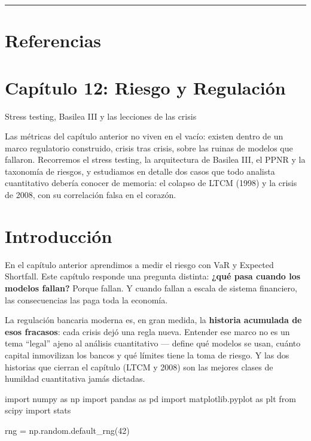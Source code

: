 \documentclass[
  spanish,
  letterpaper,
  DIV=11,
  numbers=noendperiod]{scrreprt}
\newenvironment{Shaded}{\begin{snugshade}}{\end{snugshade}}
\newcommand{\DecValTok}[1]{\textcolor[rgb]{0.68,0.00,0.00}{#1}}
\newcommand{\ImportTok}[1]{\textcolor[rgb]{0.00,0.46,0.62}{#1}}
\newcommand{\NormalTok}[1]{\textcolor[rgb]{0.00,0.23,0.31}{#1}}
\newcommand{\OperatorTok}[1]{\textcolor[rgb]{0.37,0.37,0.37}{#1}}
\begin{document}
\begin{center}\rule{0.5\linewidth}{0.5pt}\end{center}

\chapter{Referencias}\label{referencias-10}

\label{refs}

\chapter{Capítulo 12: Riesgo y
Regulación}\label{capuxedtulo-12-riesgo-y-regulaciuxf3n}

Stress testing, Basilea III y las lecciones de las crisis

Las métricas del capítulo anterior no viven en el vacío: existen dentro
de un marco regulatorio construido, crisis tras crisis, sobre las ruinas
de modelos que fallaron. Recorremos el stress testing, la arquitectura
de Basilea III, el PPNR y la taxonomía de riesgos, y estudiamos en
detalle dos casos que todo analista cuantitativo debería conocer de
memoria: el colapso de LTCM (1998) y la crisis de 2008, con su
correlación falsa en el corazón.

\hfill\break

\chapter{Introducción}\label{introducciuxf3n-9}

En el capítulo anterior aprendimos a medir el riesgo con VaR y Expected
Shortfall. Este capítulo responde una pregunta distinta: \textbf{¿qué
pasa cuando los modelos fallan?} Porque fallan. Y cuando fallan a escala
de sistema financiero, las consecuencias las paga toda la economía.

La regulación bancaria moderna es, en gran medida, la \textbf{historia
acumulada de esos fracasos}: cada crisis dejó una regla nueva. Entender
ese marco no es un tema ``legal'' ajeno al análisis cuantitativo ---
define qué modelos se usan, cuánto capital inmovilizan los bancos y qué
límites tiene la toma de riesgo. Y las dos historias que cierran el
capítulo (LTCM y 2008) son las mejores clases de humildad cuantitativa
jamás dictadas.

\label{setup}
\begin{Shaded}
\begin{Highlighting}[]
\ImportTok{import}\NormalTok{ numpy }\ImportTok{as}\NormalTok{ np}
\ImportTok{import}\NormalTok{ pandas }\ImportTok{as}\NormalTok{ pd}
\ImportTok{import}\NormalTok{ matplotlib.pyplot }\ImportTok{as}\NormalTok{ plt}
\ImportTok{from}\NormalTok{ scipy }\ImportTok{import}\NormalTok{ stats}

\NormalTok{rng }\OperatorTok{=}\NormalTok{ np.random.default\_rng(}\DecValTok{42}\NormalTok{)}
\end{Highlighting}
\end{Shaded}
\end{document}
